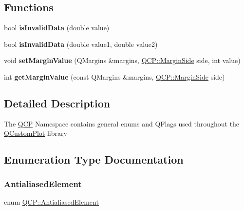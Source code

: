 \subsection*{Functions}
\begin{DoxyCompactItemize}
\item 
\mbox{\label{namespace_q_c_p_a07ab701c05329089f933b9cae2638a63}} 
bool {\bfseries is\+Invalid\+Data} (double value)
\item 
\mbox{\label{namespace_q_c_p_a728903e5c3dd17847bee280f4005496f}} 
bool {\bfseries is\+Invalid\+Data} (double value1, double value2)
\item 
\mbox{\label{namespace_q_c_p_afbf6e3084c108f2bb4372107945ee82f}} 
void {\bfseries set\+Margin\+Value} (Q\+Margins \&margins, \mbox{\hyperlink{namespace_q_c_p_a7e487e3e2ccb62ab7771065bab7cae54}{Q\+C\+P\+::\+Margin\+Side}} side, int value)
\item 
\mbox{\label{namespace_q_c_p_a23a2679d3495c444acc26acc61e35b5b}} 
int {\bfseries get\+Margin\+Value} (const Q\+Margins \&margins, \mbox{\hyperlink{namespace_q_c_p_a7e487e3e2ccb62ab7771065bab7cae54}{Q\+C\+P\+::\+Margin\+Side}} side)
\end{DoxyCompactItemize}


\subsection{Detailed Description}
The \mbox{\hyperlink{namespace_q_c_p}{Q\+CP}} Namespace contains general enums and Q\+Flags used throughout the \mbox{\hyperlink{class_q_custom_plot}{Q\+Custom\+Plot}} library 

\subsection{Enumeration Type Documentation}
\mbox{\label{namespace_q_c_p_ae55dbe315d41fe80f29ba88100843a0c}} 
\subsubsection{\texorpdfstring{Antialiased\+Element}{AntialiasedElement}}
{\footnotesize\ttfamily enum \mbox{\hyperlink{namespace_q_c_p_ae55dbe315d41fe80f29ba88100843a0c}{Q\+C\+P\+::\+Antialiased\+Element}}}

